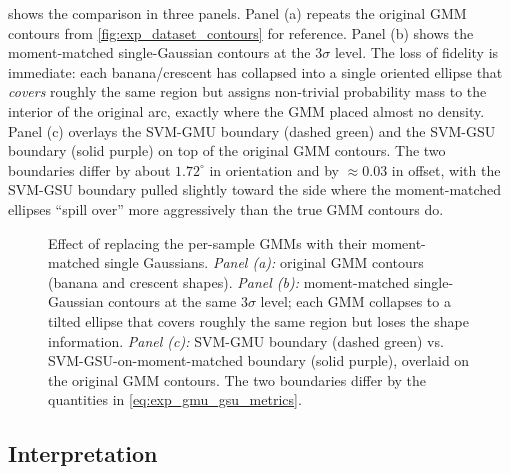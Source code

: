 \documentclass[11pt, letterpaper]{article}
\begin{document}
 shows the comparison in three panels. Panel (a) repeats the original GMM contours from \cref{fig:exp_dataset_contours} for reference. Panel (b) shows the moment-matched single-Gaussian contours at the $3\sigma$ level. The loss of fidelity is immediate: each banana/crescent has collapsed into a single oriented ellipse that \emph{covers} roughly the same region but assigns non-trivial probability mass to the interior of the original arc, exactly where the GMM placed almost no density. Panel (c) overlays the SVM-GMU boundary (dashed green) and the SVM-GSU boundary (solid purple) on top of the original GMM contours. The two boundaries differ by about $1.72^{\circ}$ in orientation and by $\approx 0.03$ in offset, with the SVM-GSU boundary pulled slightly toward the side where the moment-matched ellipses ``spill over'' more aggressively than the true GMM contours do.

\begin{figure}[H]
    \centering
    \resizebox{\textwidth}{!}{}
    \caption{Effect of replacing the per-sample GMMs with their moment-matched single Gaussians. \emph{Panel (a):} original GMM contours (banana and crescent shapes). \emph{Panel (b):} moment-matched single-Gaussian contours at the same $3\sigma$ level; each GMM collapses to a tilted ellipse that covers roughly the same region but loses the shape information. \emph{Panel (c):} SVM-GMU boundary (dashed green) vs. SVM-GSU-on-moment-matched boundary (solid purple), overlaid on the original GMM contours. The two boundaries differ by the quantities in \cref{eq:exp_gmu_gsu_metrics}.}
    \label{fig:exp_gmu_vs_gsu}
\end{figure}

\subsection{Interpretation}
\end{document}
